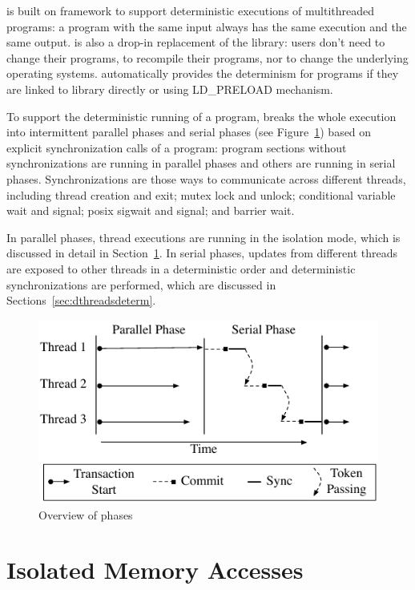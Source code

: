 \Dthreads{} is built on \Sheriff{} framework to support deterministic executions of
multithreaded programs:  a program with the same input always has the same execution and 
the same output.
\Dthreads{} is also a drop-in replacement of the \pthreads{} library:
users don't need to change their programs, 
to recompile their programs, nor to change the underlying operating
systems. \dthreads{} automatically provides the determinism for programs if they are linked to 
\dthreads{} library directly or using LD\_PRELOAD mechanism.

To support the deterministic running of a program, 
\Dthreads{} breaks the whole execution into intermittent parallel phases and serial phases 
(see Figure~\ref{fig:dthreadsphases}) based on explicit synchronization calls of a program: 
program sections without synchronizations are running in parallel 
phases and others are running in serial phases.
Synchronizations are those ways to communicate across different threads, 
including thread creation and exit; mutex lock and unlock; conditional variable wait
and signal; posix sigwait and signal; and barrier wait. 

In parallel phases, thread executions are running in the isolation mode, which is discussed 
in detail in Section~\ref{sec:dthreadsisolation}.
In serial phases, updates from different threads are exposed to other threads 
in a deterministic order and deterministic synchronizations are performed, which are 
discussed in Sections~\ref{sec:dthreadsdeterm}. 

\begin{figure}[b]
{\centering 
\includegraphics{dthreads/figure/phase-diagram} 
\caption{Overview of \dthreads{} phases
\label{fig:dthreadsphases}}
}
\end{figure}

\section{Isolated Memory Accesses}
\label{sec:dthreadsisolation}

